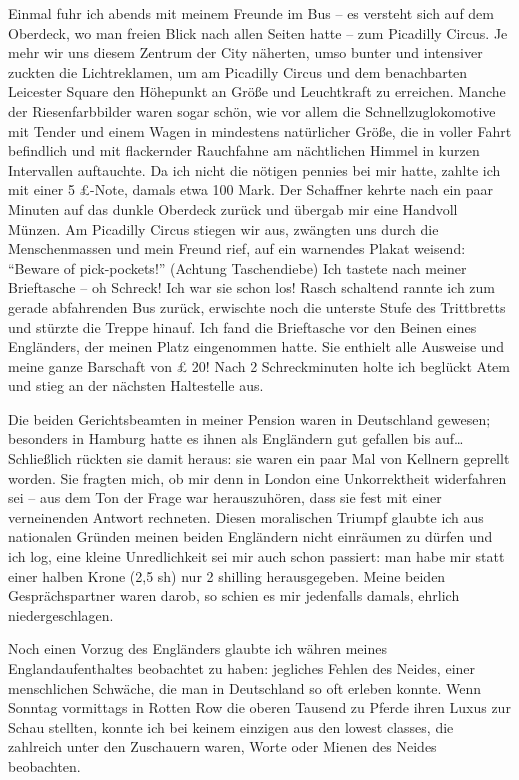 \documentclass[a5paper,pagesize,10pt,twoside=true]{scrbook}
\begin{document}
Einmal fuhr ich abends mit meinem Freunde im Bus -- es versteht sich auf dem Oberdeck, wo man freien Blick nach allen Seiten hatte -- zum Picadilly Circus. Je mehr wir uns diesem Zentrum der City näherten, umso bunter und intensiver zuckten die Lichtreklamen, um am Picadilly Circus und dem benachbarten Leicester Square den Höhepunkt an Größe und Leuchtkraft zu erreichen. Manche der Riesenfarbbilder waren sogar schön, wie vor allem die Schnellzuglokomotive mit Tender und einem Wagen in mindestens natürlicher Größe, die in voller Fahrt befindlich und mit flackernder Rauchfahne am nächtlichen Himmel in kurzen Intervallen auftauchte. Da ich nicht die nötigen pennies bei mir hatte, zahlte ich mit einer 5 £-Note, damals etwa 100 Mark. Der Schaffner kehrte nach ein paar Minuten auf das dunkle Oberdeck zurück und übergab mir eine Handvoll Münzen. Am Picadilly Circus stiegen wir aus, zwängten uns durch die Menschenmassen und mein Freund rief, auf ein warnendes Plakat weisend: \enquote{Beware of pick-pockets!} (Achtung Taschendiebe) Ich tastete nach meiner Brieftasche -- oh Schreck! Ich war sie schon los! Rasch schaltend rannte ich zum gerade abfahrenden Bus zurück, erwischte noch die unterste Stufe des Trittbretts und stürzte die Treppe hinauf. Ich fand die Brieftasche vor den Beinen eines Engländers, der meinen Platz eingenommen hatte. Sie enthielt alle Ausweise und meine ganze Barschaft von £ 20! Nach 2 Schreckminuten holte ich beglückt Atem und stieg an der nächsten Haltestelle aus.

Die beiden Gerichtsbeamten in meiner Pension waren in Deutschland gewesen; besonders in Hamburg hatte es ihnen als Engländern gut gefallen bis auf\dots Schließlich rückten sie damit heraus: sie waren ein paar Mal von Kellnern geprellt worden. Sie fragten mich, ob mir denn in London eine Unkorrektheit widerfahren sei -- aus dem Ton der Frage war herauszuhören, dass sie fest mit einer verneinenden Antwort rechneten. Diesen moralischen Triumpf glaubte ich aus nationalen Gründen meinen beiden Engländern nicht einräumen zu dürfen und ich log, eine kleine Unredlichkeit sei mir auch schon passiert: man habe mir statt einer halben Krone (2,5 sh) nur 2 shilling herausgegeben. Meine beiden Gesprächspartner waren darob, so schien es mir jedenfalls damals, ehrlich niedergeschlagen.

Noch einen Vorzug des Engländers glaubte ich währen meines Englandaufenthaltes beobachtet zu haben: jegliches Fehlen des Neides, einer menschlichen Schwäche, die man in Deutschland so oft erleben konnte. Wenn Sonntag vormittags in Rotten Row die oberen Tausend zu Pferde ihren Luxus zur Schau stellten, konnte ich bei keinem einzigen aus den lowest classes, die zahlreich unter den Zuschauern waren, Worte oder Mienen des Neides beobachten.
\end{document}
